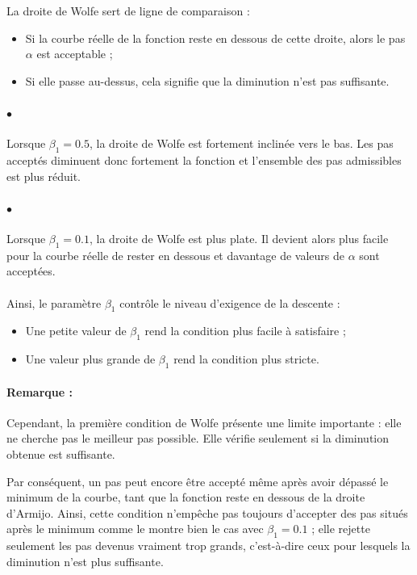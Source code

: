 \documentclass[a4paper,12pt]{article}
\begin{document}
	La droite de Wolfe sert de ligne de comparaison :
	\begin{itemize}
		\item Si la courbe réelle de la fonction reste en dessous de cette droite, alors le pas $\alpha$ est acceptable ;
		\item Si elle passe au-dessus, cela signifie que la diminution n'est pas suffisante.
	\end{itemize}
	
	\paragraph{$\bullet$}Lorsque $\beta_1=0.5$, la droite de Wolfe est fortement inclinée vers le bas. Les pas acceptés diminuent donc fortement la fonction et l'ensemble des pas admissibles est plus réduit.
	
	\paragraph{$\bullet$}Lorsque $\beta_1=0.1$, la droite de Wolfe est plus plate. Il devient alors plus facile pour la courbe réelle de rester en dessous et davantage de valeurs de $\alpha$ sont acceptées.
	
	\paragraph{}Ainsi, le paramètre $\beta_1$ contrôle le niveau d'exigence de la descente :
	\begin{itemize}
		\item Une petite valeur de $\beta_1$ rend la condition plus facile à satisfaire ;
		\item Une valeur plus grande de $\beta_1$ rend la condition plus stricte.
	\end{itemize}
	
	\paragraph{Remarque :} Cependant, la première condition de Wolfe présente une limite importante : elle ne cherche pas le meilleur pas possible. Elle vérifie seulement si la diminution obtenue est suffisante.
	
	Par conséquent, un pas peut encore être accepté même après avoir dépassé le minimum de la courbe, tant que la fonction reste en dessous de la droite d'Armijo. Ainsi, cette condition n'empêche pas toujours d'accepter des pas situés après le minimum comme le montre bien le cas avec $\beta_1=0.1$ ; elle rejette seulement les pas devenus vraiment trop grands, c'est-à-dire ceux pour lesquels la diminution n'est plus suffisante.
	
\end{document}
